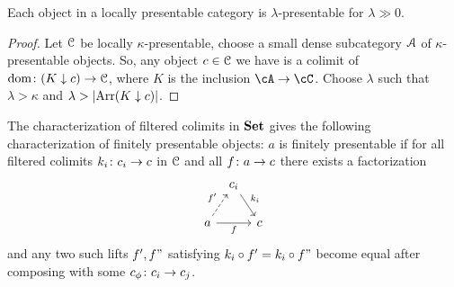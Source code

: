\documentclass[a4paper,11pt,oneside,openany]{scrbook}
\begin{document}
\begin{prop}
	Each object in a locally presentable category is $ \lambda $-presentable
	for $ \lambda \gg 0 $.
\end{prop}
\begin{proof}
	Let $ \operatorname{\mathcal{C}} $ be locally $\kappa $-presentable, choose a small dense subcategory $\operatorname{\mathcal{A}} $ of $ \kappa $-presentable objects.
	So, any object $ c \in \operatorname{\mathcal{C}} $ we have is a colimit of $\operatorname{dom}\colon (K\downarrow
    c)\rightarrow\operatorname{\mathcal{C}}$, where $K$ is the inclusion $\cA\rightarrow\cC$.
	Choose $ \lambda $ such that $ \lambda > \kappa $ and $ \lambda >
    \left\lvert \operatorname{Arr}(K\downarrow c) \right\rvert $.
\end{proof}
The characterization of filtered colimits in $ {\normalfont\textbf{Set}} $ gives the following characterization of finitely presentable objects:
$ a $ is finitely presentable if for all filtered colimits $ k_i \colon c_i \to c $ in $ \operatorname{\mathcal{C}} $ and all $ f\colon a \to c $ there exists a factorization
\begin{displaymath}
	\begin{tikzcd}[column sep=tiny]
		& c_i \arrow[dr, "k_i"]&\\
		a \arrow[ur, dashed, "f'"]\arrow[rr, "f"']&& c
	\end{tikzcd}
\end{displaymath}
and any two such lifts $ f', f"  $ satisfying $ k_i \circ f' = k_i \circ f" $ become equal after composing with some $ c_\phi \colon c_i \to c_j $.
\end{document}
